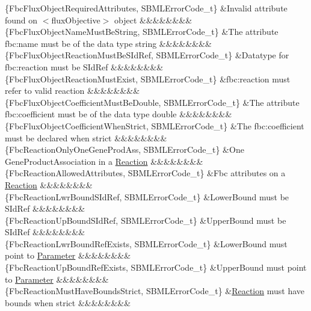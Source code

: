 \begin{DoxyParagraph}{}
\begin{longtabu}
\{Fbc\+Flux\+Object\+Required\+Attributes, S\+B\+M\+L\+Error\+Code\+\_\+t\} &Invalid attribute found on {\ttfamily $<$flux\+Objective$>$} object &&&&&&&&\\
\{Fbc\+Flux\+Object\+Name\+Must\+Be\+String, S\+B\+M\+L\+Error\+Code\+\_\+t\} &The attribute \textquotesingle{}fbc\+:name\textquotesingle{} must be of the data type string &&&&&&&&\\
\{Fbc\+Flux\+Object\+Reaction\+Must\+Be\+S\+Id\+Ref, S\+B\+M\+L\+Error\+Code\+\_\+t\} &Datatype for \textquotesingle{}fbc\+:reaction\textquotesingle{} must be S\+Id\+Ref &&&&&&&&\\
\{Fbc\+Flux\+Object\+Reaction\+Must\+Exist, S\+B\+M\+L\+Error\+Code\+\_\+t\} &\textquotesingle{}fbc\+:reaction\textquotesingle{} must refer to valid reaction &&&&&&&&\\
\{Fbc\+Flux\+Object\+Coefficient\+Must\+Be\+Double, S\+B\+M\+L\+Error\+Code\+\_\+t\} &The attribute \textquotesingle{}fbc\+:coefficient\textquotesingle{} must be of the data type double &&&&&&&&\\
\{Fbc\+Flux\+Object\+Coefficient\+When\+Strict, S\+B\+M\+L\+Error\+Code\+\_\+t\} &The \textquotesingle{}fbc\+:coefficient\textquotesingle{} must be declared when strict &&&&&&&&\\
\{Fbc\+Reaction\+Only\+One\+Gene\+Prod\+Ass, S\+B\+M\+L\+Error\+Code\+\_\+t\} &One Gene\+Product\+Association in a \hyperlink{class_reaction}{Reaction} &&&&&&&&\\
\{Fbc\+Reaction\+Allowed\+Attributes, S\+B\+M\+L\+Error\+Code\+\_\+t\} &Fbc attributes on a \hyperlink{class_reaction}{Reaction} &&&&&&&&\\
\{Fbc\+Reaction\+Lwr\+Bound\+S\+Id\+Ref, S\+B\+M\+L\+Error\+Code\+\_\+t\} &Lower\+Bound must be S\+Id\+Ref &&&&&&&&\\
\{Fbc\+Reaction\+Up\+Bound\+S\+Id\+Ref, S\+B\+M\+L\+Error\+Code\+\_\+t\} &Upper\+Bound must be S\+Id\+Ref &&&&&&&&\\
\{Fbc\+Reaction\+Lwr\+Bound\+Ref\+Exists, S\+B\+M\+L\+Error\+Code\+\_\+t\} &Lower\+Bound must point to \hyperlink{class_parameter}{Parameter} &&&&&&&&\\
\{Fbc\+Reaction\+Up\+Bound\+Ref\+Exists, S\+B\+M\+L\+Error\+Code\+\_\+t\} &Upper\+Bound must point to \hyperlink{class_parameter}{Parameter} &&&&&&&&\\
\{Fbc\+Reaction\+Must\+Have\+Bounds\+Strict, S\+B\+M\+L\+Error\+Code\+\_\+t\} &\hyperlink{class_reaction}{Reaction} must have bounds when strict &&&&&&&&\\

\end{longtabu}
\end{DoxyParagraph}
